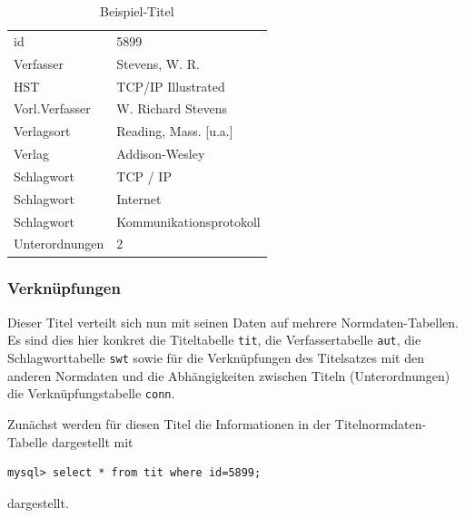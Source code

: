 \documentclass[11pt, twoside, a4paper, BCOR8mm, DIV12, bibtotoc,idxtotoc]{scrbook}
\begin{document}
\begin{table}
  \begin{shadowenv}
    \vspace{3mm}
    \begin{center}
      \begin{tabular}{ll}
        id	        & 5899\\
        Verfasser	& Stevens, W. R.\\
        HST	        & TCP/IP Illustrated\\
        Vorl.Verfasser	& W. Richard Stevens\\
        Verlagsort	& Reading, Mass. [u.a.]\\
        Verlag	        & Addison-Wesley\\
        Schlagwort	& TCP / IP\\
        Schlagwort	& Internet\\
        Schlagwort	& Kommunikationsprotokoll\\
        Unterordnungen	& 2\\
      \end{tabular}
    \end{center}
    \caption{Beispiel-Titel\label{beispieltitel}}
    \vspace{3mm}
  \end{shadowenv}
\end{table}

\subsubsection{Verknüpfungen}
Dieser Titel verteilt sich nun mit seinen Daten auf mehrere
Normdaten-Tabellen. Es sind dies hier konkret die Titeltabelle
\texttt{tit}, die Verfassertabelle \texttt{aut}, die Schlagworttabelle
\texttt{swt} sowie für die Verknüpfungen des Titelsatzes mit den
anderen Normdaten und die Abhängigkeiten zwischen Titeln
(Unterordnungen) die Verknüpfungstabelle \texttt{conn}.

Zunächst werden für diesen Titel die Informationen in der
Titelnormdaten-Tabelle dargestellt mit 

\begin{verbatim}
mysql> select * from tit where id=5899;
\end{verbatim}

dargestellt.
\end{document}
